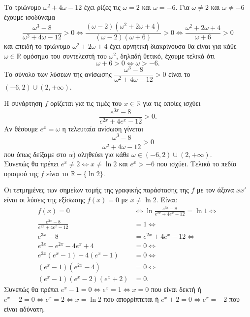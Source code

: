 \begin{alist}
\item Το τριώνυμο $\omega^2 + 4\omega - 12$ έχει ρίζες τις $\omega = 2$ και $\omega = -6$. Για $\omega \neq 2$ και $\omega \neq -6$ έχουμε ισοδύναμα
\[\frac{\omega^3 - 8}{\omega^2 + 4\omega - 12} > 0 \Leftrightarrow \frac{(\omega - 2)(\omega^2 + 2\omega + 4)}{(\omega - 2)(\omega + 6)} > 0 \Leftrightarrow \frac{\omega^2 + 2\omega + 4}{\omega + 6} > 0\]
και επειδή το τριώνυμο $\omega^2 + 2\omega + 4$ έχει αρνητική διακρίνουσα θα είναι για κάθε $\omega \in \mathbb{R}$ ομόσημο του συντελεστή του $\omega^2$, δηλαδή θετικό, έχουμε τελικά ότι
\[\omega + 6 > 0 \Leftrightarrow \omega > -6.\]
Το σύνολο των λύσεων της ανίσωσης $\dfrac{\omega^3 - 8}{\omega^2 + 4\omega - 12} > 0$ είναι το $(-6, 2) \cup (2, +\infty)$.
\item Η συνάρτηση $f$ ορίζεται για τις τιμές του $x \in \mathbb{R}$ για τις οποίες ισχύει
\[\frac{e^{3x} - 8}{e^{2x} + 4e^x - 12} > 0.\]
Αν θέσουμε $e^x = \omega$ η τελευταία ανίσωση γίνεται
\[\frac{\omega^3 - 8}{\omega^2 + 4\omega - 12} > 0\]
που όπως δείξαμε στο $\alpha$) αληθεύει για κάθε $\omega \in (-6, 2) \cup (2, +\infty)$. \\
Συνεπώς θα πρέπει $e^x \neq 2 \Leftrightarrow x \neq \ln 2$ και $e^x > -6$ που ισχύει. Τελικά το πεδίο ορισμού της $f$ είναι το $\mathbb{R} - \{\ln 2\}$.
\item Οι τετμημένες των σημείων τομής της γραφικής παράστασης της $f$ με τον άξονα $xx'$ είναι οι λύσεις της εξίσωσης $f(x) = 0$ με $x \neq \ln 2$. Είναι:
\begin{align*}
f(x) = 0 &\Leftrightarrow \ln\frac{e^{3x} - 8}{e^{2x} + 4e^x - 12} = \ln 1 \Leftrightarrow \\
\frac{e^{3x} - 8}{e^{2x} + 4e^x - 12} &= 1 \Leftrightarrow \\
e^{3x} - 8 &= e^{2x} + 4e^x - 12 \Leftrightarrow \\
e^{3x} - e^{2x} - 4e^x + 4 &= 0 \Leftrightarrow \\
e^{2x}(e^x - 1) - 4(e^x - 1) &= 0 \Leftrightarrow \\
(e^x - 1)(e^{2x} - 4) &= 0 \Leftrightarrow \\
(e^x - 1)(e^x - 2)(e^x + 2) &= 0.
\end{align*}
Συνεπώς θα πρέπει $e^x - 1 = 0 \Leftrightarrow e^x = 1 \Leftrightarrow x = 0$ που είναι δεκτή ή $e^x - 2 = 0 \Leftrightarrow e^x = 2 \Leftrightarrow x = \ln 2$ που απορρίπτεται ή $e^x + 2 = 0 \Leftrightarrow e^x = -2$ που είναι αδύνατη.
\end{alist}

